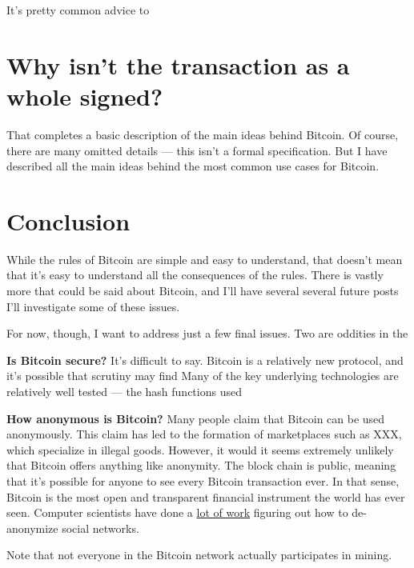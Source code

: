 \documentclass[12pt]{book}
\newcommand{\link}[2]{\href{#1}{#2}}
\begin{document}
It's pretty common advice to  

\section{Why isn't the transaction as a whole signed?}


That completes a basic description of the main ideas behind Bitcoin.
Of course, there are many omitted details --- this isn't a formal
specification.  But I have described all the main ideas behind the
most common use cases for Bitcoin.

\section{Conclusion}

While the rules of Bitcoin are simple and easy to understand, that
doesn't mean that it's easy to understand all the consequences of the
rules.  There is vastly more that could be said about Bitcoin, and
I'll have several several future posts I'll investigate some of these
issues.

For now, though, I want to address just a few final issues.  Two are
oddities in the 


\textbf{Is Bitcoin secure?}  It's difficult to say.  Bitcoin is a
relatively new protocol, and it's possible that scrutiny may find Many
of the key underlying technologies are relatively well tested --- the
hash functions used

\textbf{How anonymous is Bitcoin?} Many people claim that Bitcoin can
be used anonymously.  This claim has led to the formation of
marketplaces such as XXX, which specialize in illegal goods.  However,
it would it seems extremely unlikely that Bitcoin offers anything like
anonymity.  The block chain is public, meaning that it's possible for
anyone to see every Bitcoin transaction ever.  In that sense, Bitcoin
is the most open and transparent financial instrument the world has
ever seen.  Computer scientists have done a
\link{http://scholar.google.com/scholar?q=de-anonymization}{lot of
  work} figuring out how to de-anonymize social networks.





Note that not everyone in the Bitcoin network actually participates in
mining.
\end{document}
